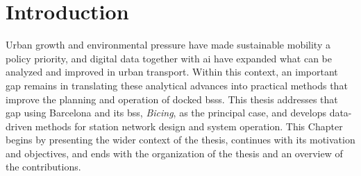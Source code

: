 \chapter{Introduction}
\label{ch:intro}

Urban growth and environmental pressure have made sustainable mobility a policy priority, and digital data together with \ac{ai} have expanded what can be analyzed and improved in urban transport. Within this context, an important gap remains in translating these analytical advances into practical methods that improve the planning and operation of docked \acp{bss}. This thesis addresses that gap using Barcelona and its \ac{bss}, \textit{Bicing}, as the principal case, and develops data-driven methods for station network design and system operation. This Chapter begins by presenting the wider context of the     thesis, continues with its motivation and objectives, and ends with the organization of the thesis and an overview of the contributions.





